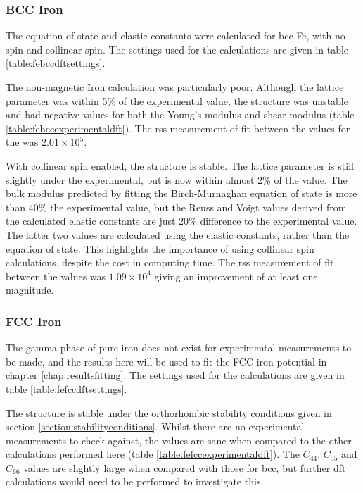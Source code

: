 \FloatBarrier
\subsubsection{BCC Iron}

The equation of state and elastic constants were calculated for \acrshort{bcc} Fe, with no-spin and collinear spin.  The settings used for the calculations are given in table \ref{table:febccdftsettings}. 


The non-magnetic Iron calculation was particularly poor.  Although the lattice parameter was within 5\% of the experimental value, the structure was unstable and had negative values for both the Young's modulus and shear modulus (table \ref{table:febccexperimentaldft}).  The \acrshort{rss} measurement of fit between the values for the was $2.01 \times 10^5$.

With collinear spin enabled, the structure is stable.  The lattice parameter is still slightly under the experimental, but is now within almost 2\% of the value.  The bulk modulus predicted by fitting the Birch-Murnaghan equation of state is more than 40\% the experimental value, but the Reuss and Voigt values derived from the calculated elastic constants are just 20\% difference to the experimental value.  The latter two values are calculated using the elastic constants, rather than the equation of state.  This highlights the importance of using collinear spin calculations, despite the cost in computing time.  The \acrshort{rss} measurement of fit between the values was $1.09 \times 10^4$ giving an improvement of at least one magnitude.




\FloatBarrier
\subsubsection{FCC Iron}
\label{section:fccferesults}

The gamma phase of pure iron does not exist for experimental measurements to be made, and the results here will be used to fit the FCC iron potential in chapter \ref{chap:resultsfitting}.  The settings used for the calculations are given in table \ref{table:fefccdftsettings}. 

The structure is stable under the orthorhombic stability conditions given in section \ref{section:stabilityconditions}.  Whilst there are no experimental measurements to check against, the values are sane when compared to the other calculations performed here (table \ref{table:fefccexperimentaldft}).  The $C_{44}$, $C_{55}$ and $C_{66}$ values are slightly large when compared with those for \acrshort{bcc}, but further \acrshort{dft} calculations would need to be performed to investigate this.  


